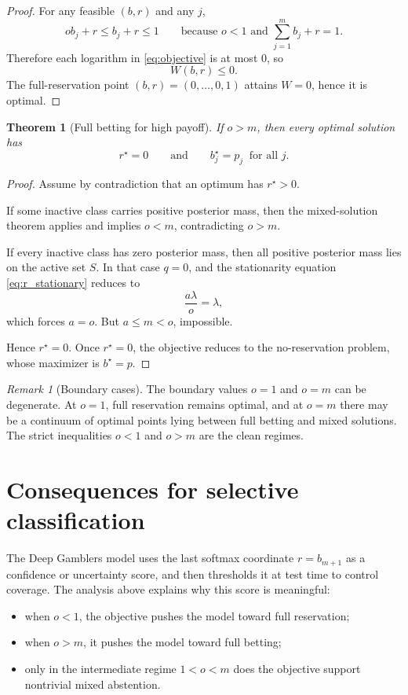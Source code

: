 \documentclass[11pt]{article}
\newtheorem{theorem}{Theorem}
\theoremstyle{remark}
\newtheorem{remark}{Remark}
\begin{document}
\begin{proof}
For any feasible $(b,r)$ and any $j$,
\[
o b_j+r\le b_j+r\le 1
\qquad\text{because } o<1 \text{ and } \sum_{j=1}^m b_j+r=1.
\]
Therefore each logarithm in \eqref{eq:objective} is at most $0$, so
\[
W(b,r)\le 0.
\]
The full-reservation point $(b,r)=(0,\dots,0,1)$ attains $W=0$, hence it is optimal.
\end{proof}

\begin{theorem}[Full betting for high payoff]
If $o>m$, then every optimal solution has
\[
r^\star=0
\qquad\text{and}\qquad
b_j^\star=p_j\ \text{ for all }j.
\]
\end{theorem}

\begin{proof}
Assume by contradiction that an optimum has $r^\star>0$.

If some inactive class carries positive posterior mass, then the mixed-solution theorem applies and implies $o<m$, contradicting $o>m$.

If every inactive class has zero posterior mass, then all positive posterior mass lies on the active set $S$. In that case $q=0$, and the stationarity equation \eqref{eq:r_stationary} reduces to
\[
\frac{a\lambda}{o}=\lambda,
\]
which forces $a=o$. But $a\le m<o$, impossible.

Hence $r^\star=0$. Once $r^\star=0$, the objective reduces to the no-reservation problem, whose maximizer is $b^\star=p$.
\end{proof}

\begin{remark}[Boundary cases]
The boundary values $o=1$ and $o=m$ can be degenerate.
At $o=1$, full reservation remains optimal, and at $o=m$ there may be a continuum of optimal points lying between full betting and mixed solutions.
The strict inequalities $o<1$ and $o>m$ are the clean regimes.
\end{remark}

\section{Consequences for selective classification}

The Deep Gamblers model uses the last softmax coordinate $r=b_{m+1}$ as a confidence or uncertainty score, and then thresholds it at test time to control coverage.
The analysis above explains why this score is meaningful:

\begin{itemize}[leftmargin=2em]
\item when $o<1$, the objective pushes the model toward full reservation;
\item when $o>m$, it pushes the model toward full betting;
\item only in the intermediate regime $1<o<m$ does the objective support nontrivial mixed abstention.
\end{itemize}
\end{document}
